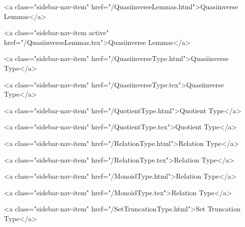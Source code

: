       
    
      
        
          <a class="sidebar-nav-item" href="/QuasiinverseLemmas.html">Quasiinverse Lemmas</a>
        
      
    
      
        
          <a class="sidebar-nav-item active" href="/QuasiinverseLemmas.tex">Quasiinverse Lemmas</a>
        
      
    
      
        
          <a class="sidebar-nav-item" href="/QuasiinverseType.html">Quasiinverse Type</a>
        
      
    
      
        
          <a class="sidebar-nav-item" href="/QuasiinverseType.tex">Quasiinverse Type</a>
        
      
    
      
        
          <a class="sidebar-nav-item" href="/QuotientType.html">Quotient Type</a>
        
      
    
      
        
          <a class="sidebar-nav-item" href="/QuotientType.tex">Quotient Type</a>
        
      
    
      
        
          <a class="sidebar-nav-item" href="/RelationType.html">Relation Type</a>
        
      
    
      
        
          <a class="sidebar-nav-item" href="/RelationType.tex">Relation Type</a>
        
      
    
      
        
          <a class="sidebar-nav-item" href="/MonoidType.html">Relation Type</a>
        
      
    
      
        
          <a class="sidebar-nav-item" href="/MonoidType.tex">Relation Type</a>
        
      
    
      
        
          <a class="sidebar-nav-item" href="/SetTruncationType.html">Set Truncation Type</a>
        

